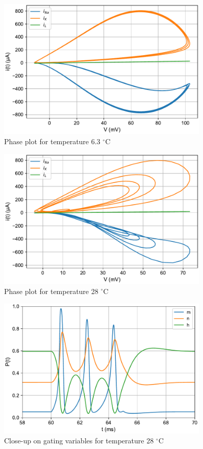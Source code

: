 \documentclass{scrartcl}
\begin{document}
\newpage
\begin{figure}[h]
	\centering
	\includegraphics[width=0.9\textwidth]{figures/phase_temp6.3.pdf}
	\caption{Phase plot for temperature 6.3 $^{\circ}$C}
	\label{fig:phase_temp6_3}
\end{figure}
\begin{figure}[h!]
	\centering
	\includegraphics[width=0.9\textwidth]{figures/phase_temp28.pdf}
	\caption{Phase plot for temperature 28 $^{\circ}$C}
	\label{fig:phase_temp28}
\end{figure}

\newpage
\begin{figure}[h]
	\centering
	\includegraphics[width=0.9\textwidth]{figures/closeup_temp28.pdf}
	\caption{Close-up on gating variables for temperature 28 $^{\circ}$C}
	\label{fig:closeup_temp28}
\end{figure}
\end{document}
